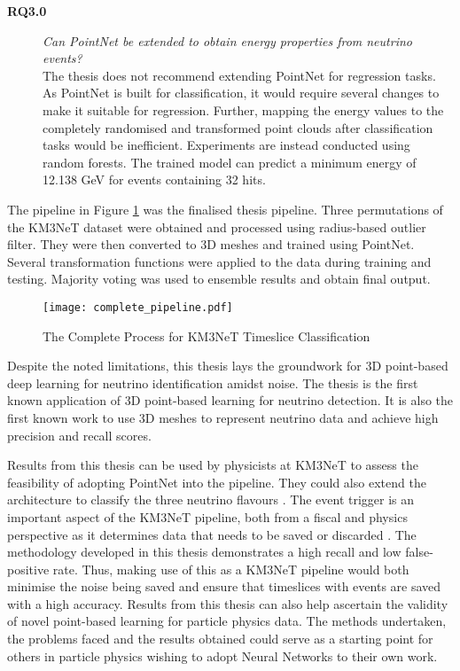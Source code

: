\begin{description}
    \item[\textbf{RQ3.0}] \textit{Can PointNet be extended to obtain energy properties from neutrino events?} \\
    The thesis does not recommend extending PointNet for regression tasks. As PointNet is built for classification, it would require several changes to make it suitable for regression. Further, mapping the energy values to the completely randomised and transformed point clouds after classification tasks would be inefficient. Experiments are instead conducted using random forests. The trained model can predict a minimum energy of 12.138 GeV for events containing 32 hits.

\end{description}

The pipeline in Figure \ref{fig:complete_pipeline} was the finalised thesis pipeline. Three permutations of the KM3NeT dataset were obtained and processed using radius-based outlier filter. They were then converted to 3D meshes and trained using PointNet. Several transformation functions were applied to the data during training and testing. Majority voting was used to ensemble results and obtain final output.

\begin{figure}[ht!]
    \centering
    \texttt{[image: complete\_pipeline.pdf]}
    \caption{The Complete Process for KM3NeT Timeslice Classification}
    \label{fig:complete_pipeline}
\end{figure}

Despite the noted limitations, this thesis lays the groundwork for 3D point-based deep learning for neutrino identification amidst noise. The thesis is the first known application of 3D point-based learning for neutrino detection. It is also the first known work to use 3D meshes to represent neutrino data and achieve high precision and recall scores. 

Results from this thesis can be used by physicists at KM3NeT to assess the feasibility of adopting PointNet into the pipeline. They could also extend the architecture to classify the three neutrino flavours \cite{km3net_2017}. The event trigger is an important aspect of the KM3NeT pipeline, both from a fiscal and physics perspective as it determines data that needs to be saved or discarded \cite{km3net_2017}. The methodology developed in this thesis demonstrates a high recall and low false-positive rate. Thus, making use of this as a KM3NeT pipeline would both minimise the noise being saved and ensure that timeslices with events are saved with a high accuracy. Results from this thesis can also help ascertain the validity of novel point-based learning for particle physics data. The methods undertaken, the problems faced and the results obtained could serve as a starting point for others in particle physics wishing to adopt Neural Networks to their own work.

